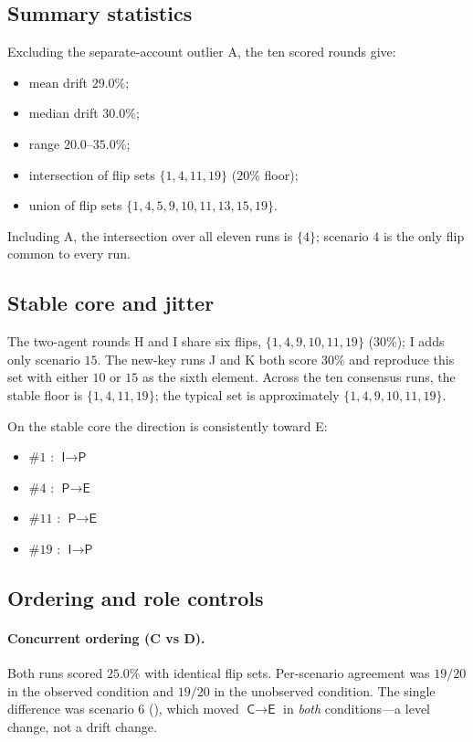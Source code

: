 \documentclass[11pt,a4paper]{article}
\newcommand{\ActE}{\textsf{E}}
\newcommand{\ActI}{\textsf{I}}
\newcommand{\ActP}{\textsf{P}}
\newcommand{\ActC}{\textsf{C}}
\begin{document}
\subsection{Summary statistics}

Excluding the separate-account outlier A, the ten scored rounds give:
\begin{itemize}[leftmargin=1.4em]
  \item mean drift $29.0\%$;
  \item median drift $30.0\%$;
  \item range $20.0$--$35.0\%$;
  \item intersection of flip sets $\{1,4,11,19\}$ ($20\%$ floor);
  \item union of flip sets $\{1,4,5,9,10,11,13,15,19\}$.
\end{itemize}
Including A, the intersection over all eleven runs is $\{4\}$; scenario $4$ is
the only flip common to every run.

\subsection{Stable core and jitter}

The two-agent rounds H and I share six flips,
$\{1,4,9,10,11,19\}$ ($30\%$); I adds only scenario $15$. The new-key runs J
and K both score $30\%$ and reproduce this set with either $10$ or $15$ as the
sixth element. Across the ten consensus runs, the stable floor is
$\{1,4,11,19\}$; the typical set is approximately
$\{1,4,9,10,11,19\}$.

On the stable core the direction is consistently toward \ActE:
\begin{itemize}[leftmargin=1.4em]
  \item $\#1$ : $\ActI\to\ActP$
  \item $\#4$ : $\ActP\to\ActE$
  \item $\#11$ : $\ActP\to\ActE$
  \item $\#19$ : $\ActI\to\ActP$
\end{itemize}

\subsection{Ordering and role controls}

\paragraph{Concurrent ordering (C vs D).} Both runs scored $25.0\%$ with
identical flip sets. Per-scenario agreement was $19/20$ in the observed
condition and $19/20$ in the unobserved condition. The single difference was
scenario $6$ (), which moved $\ActC\to\ActE$ in
\emph{both} conditions---a level change, not a drift change.
\end{document}
